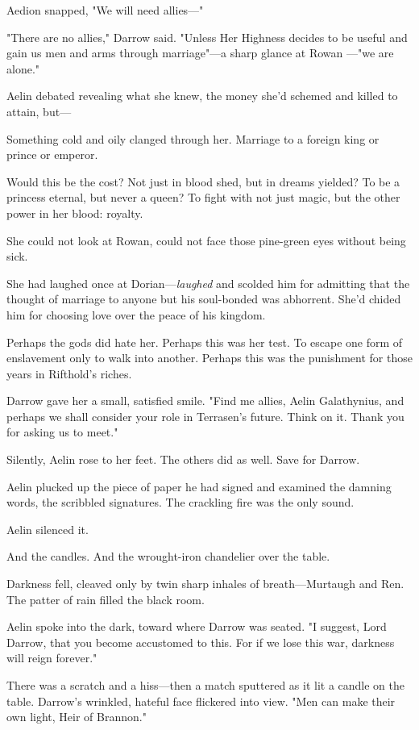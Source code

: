 Aedion snapped, "We will need allies---"

"There are no allies," Darrow said. "Unless Her Highness decides to be useful and gain us men and arms through marriage"---a sharp glance at Rowan ---"we are alone."

Aelin debated revealing what she knew, the money she'd schemed and killed to attain, but---

Something cold and oily clanged through her. Marriage to a foreign king or prince or emperor.

Would this be the cost? Not just in blood shed, but in dreams yielded? To be a princess eternal, but never a queen? To fight with not just magic, but the other power in her blood: royalty.

She could not look at Rowan, could not face those pine-green eyes without being sick.

She had laughed once at Dorian---\emph{laughed} and scolded him for admitting that the thought of marriage to anyone but his soul-bonded was abhorrent. She'd chided him for choosing love over the peace of his kingdom.

Perhaps the gods did hate her. Perhaps this was her test. To escape one form of enslavement only to walk into another. Perhaps this was the punishment for those years in Rifthold's riches.

Darrow gave her a small, satisfied smile. "Find me allies, Aelin Galathynius, and perhaps we shall consider your role in Terrasen's future. Think on it. Thank you for asking us to meet."

Silently, Aelin rose to her feet. The others did as well. Save for Darrow.

Aelin plucked up the piece of paper he had signed and examined the damning words, the scribbled signatures. The crackling fire was the only sound.

Aelin silenced it.

And the candles. And the wrought-iron chandelier over the table.

Darkness fell, cleaved only by twin sharp inhales of breath---Murtaugh and Ren. The patter of rain filled the black room.

Aelin spoke into the dark, toward where Darrow was seated. "I suggest, Lord Darrow, that you become accustomed to this. For if we lose this war, darkness will reign forever."

There was a scratch and a hiss---then a match sputtered as it lit a candle on the table. Darrow's wrinkled, hateful face flickered into view. "Men can make their own light, Heir of Brannon."

